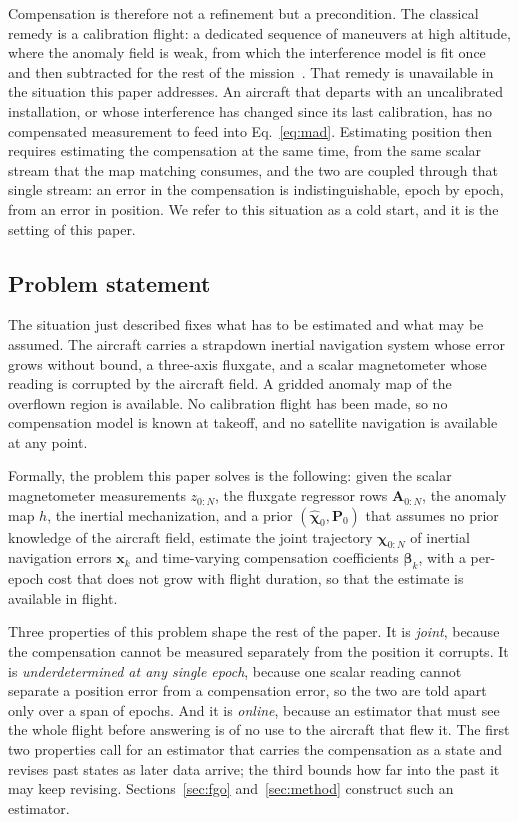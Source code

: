 \documentclass{IEEEtaes}
\begin{document}
Compensation is therefore not a refinement but a precondition. The classical
remedy is a calibration flight: a dedicated sequence of maneuvers at high
altitude, where the anomaly field is weak, from which the interference model is
fit once and then subtracted for the rest of the
mission~\cite{tolles1950,leliak1961,bickel1979}. That remedy is unavailable in
the situation this paper addresses. An aircraft that departs with an
uncalibrated installation, or whose interference has changed since its last
calibration, has no compensated measurement to feed
into Eq.~\eqref{eq:mad}. Estimating position then requires estimating the
compensation at the same time, from the same scalar stream that the map
matching consumes, and the two are coupled through that single stream: an error
in the compensation is indistinguishable, epoch by epoch, from an error in
position. We refer to this situation as a cold start, and it is the setting of
this paper.

\subsection{Problem statement}\label{sec:statement}
The situation just described fixes what has to be estimated and what may be
assumed. The aircraft carries a strapdown inertial navigation system whose
error grows without bound, a three-axis fluxgate, and a scalar magnetometer
whose reading is corrupted by the aircraft field. A gridded anomaly map of the
overflown region is available. No calibration flight has been made, so no
compensation model is known at takeoff, and no satellite navigation is
available at any point.

Formally, the problem this paper solves is the following:
given the scalar magnetometer measurements $z_{0:N}$, the fluxgate regressor
rows $\mathbf{A}_{0:N}$, the anomaly map $h$, the inertial mechanization, and a
prior $(\hat{\boldsymbol{\chi}}_0,\mathbf{P}_0)$ that assumes no prior
knowledge of the aircraft field, estimate the joint trajectory
$\boldsymbol{\chi}_{0:N}$ of inertial navigation errors $\mathbf{x}_k$ and
time-varying compensation coefficients $\boldsymbol{\beta}_k$, with a per-epoch
cost that does not grow with flight duration, so that the estimate is
available in flight.

Three properties of this problem shape the rest of the paper. It is
\emph{joint}, because the compensation cannot be measured separately from the
position it corrupts. It is \emph{underdetermined at any single epoch}, because
one scalar reading cannot separate a position error from a compensation error,
so the two are told apart only over a span of epochs. And it is
\emph{online}, because an estimator that must see the whole flight before
answering is of no use to the aircraft that flew it. The first two properties
call for an estimator that carries the compensation as a state and revises past
states as later data arrive; the third bounds how far into the past it may keep
revising. Sections~\ref{sec:fgo} and~\ref{sec:method} construct such an
estimator.
\end{document}
